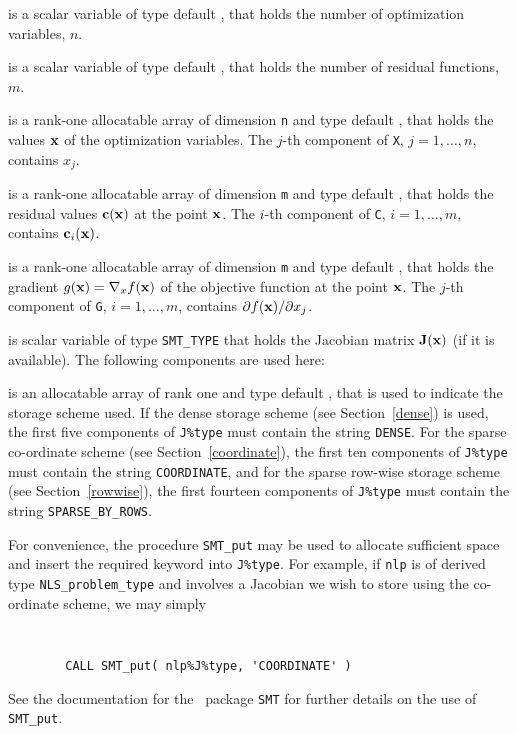 \documentclass{galahad}
\newcommand{\packagename}{NLS}
\begin{document}
\begin{description}

 is a scalar variable of type default \integer,
 that holds the number of optimization variables, $n$.

 is a scalar variable of type default \integer,
 that holds the number of residual functions, $m$.



 is a rank-one allocatable array of dimension {\tt n} and type
default \realdp, that holds the values ${\mathbf{x}}$ of the optimization variables.
The $j$-th component of {\tt X}, $j = 1,  \ldots , n$, contains $x_{j}$.

 is a rank-one allocatable array of dimension {\tt m} and type
default \realdp, that holds the residual values ${\mathbf{c}}({\mathbf{x}})$
at the point ${\mathbf{x}}$. The $i$-th component of
{\tt C}, $i = 1, \ldots, m$, contains ${\mathbf{c}}_{i}({\mathbf{x}})$.

 is a rank-one allocatable array of dimension {\tt m} and type
default \realdp, that holds the gradient $g({\mathbf{x}}) = \nabla_x f({\mathbf{x}})$ of the
objective function at the point ${\mathbf{x}}$. The $j$-th component of
{\tt G}, $i = 1, \ldots, m$, contains $\partial f({\mathbf{x}})/\partial x_j$.

 is scalar variable of type {\tt SMT\_TYPE}
that holds the Jacobian matrix ${\mathbf{J}}({\mathbf{x}})$ (if it is available).
The following components are used here:

\begin{description}

 is an allocatable array of rank one and type default
\character, that
is used to indicate the storage scheme used. If the dense storage scheme
(see Section~\ref{dense}) is used,
the first five components of {\tt J\%type} must contain the
string {\tt DENSE}.
For the sparse co-ordinate scheme (see Section~\ref{coordinate}),
the first ten components of {\tt J\%type} must contain the
string {\tt COORDINATE},
and for the sparse row-wise storage scheme (see Section~\ref{rowwise}),
the first fourteen components of {\tt J\%type} must contain the
string {\tt SPARSE\_BY\_ROWS}.

For convenience, the procedure {\tt SMT\_put}
may be used to allocate sufficient space and insert the required keyword
into {\tt J\%type}.
For example, if {\tt nlp} is of derived type {\tt \packagename\_problem\_type}
and involves a Jacobian we wish to store using the co-ordinate scheme,
we may simply
{\tt
\begin{verbatim}
        CALL SMT_put( nlp%J%type, 'COORDINATE' )
\end{verbatim}
}
\noindent
See the documentation for the \galahad\ package {\tt SMT}
for further details on the use of {\tt SMT\_put}.


\end{description}
\end{description}
\end{document}
